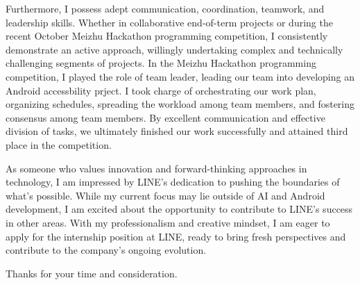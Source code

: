 \begin{cvletter}
Furthermore, I possess adept communication, coordination, teamwork, and leadership skills. Whether in collaborative end-of-term projects or during the recent October Meizhu Hackathon programming competition, I consistently demonstrate an active approach, willingly undertaking complex and technically challenging segments of projects. In the Meizhu Hackathon programming competition, I played the role of team leader, leading our team into developing an Android accessbility prject. I took charge of orchestrating our work plan, organizing schedules, spreading the workload among team members, and fostering consensus among team members. By excellent communication and effective division of tasks, we ultimately finished our work successfully and attained third place in the competition.


As someone who values innovation and forward-thinking approaches in technology, I am impressed by LINE's dedication to pushing the boundaries of what's possible. While my current focus may lie outside of AI and Android development, I am excited about the opportunity to contribute to LINE's success in other areas. With my professionalism and creative mindset, I am eager to apply for the internship position at LINE, ready to bring fresh perspectives and contribute to the company's ongoing evolution.

Thanks for your time and consideration.


\end{cvletter}


